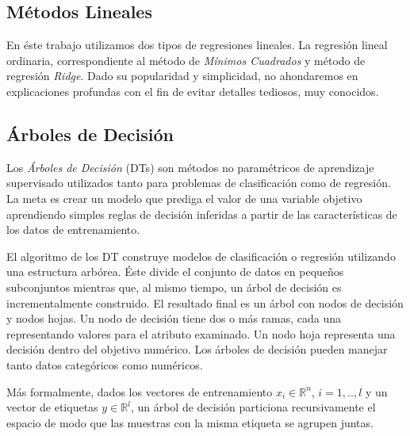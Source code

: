 \subsection{Métodos Lineales}

  \par En éste trabajo utilizamos dos tipos de regresiones lineales. La regresión
  lineal ordinaria, correspondiente al método de \textit{Mínimos Cuadrados}\cite{least_square}
  y método de regresión \textit{Ridge}\cite{ridge}.
  Dado su popularidad y simplicidad, no ahondaremos en explicaciones profundas
  con el fin de evitar detalles tediosos, muy conocidos.


\subsection{Árboles de Decisión}
  \par Los \textit{Árboles de Decisión} (DTs)\cite{decision_tree_regression}
    son métodos no paramétricos de aprendizaje supervisado
    utilizados tanto para problemas de clasificación como de regresión.
    La meta es crear un modelo que prediga el valor de una variable objetivo aprendiendo
    simples reglas de decisión inferidas a partir de las características de los datos
    de entrenamiento.


  \par El algoritmo de los DT construye modelos de clasificación o regresión
    utilizando una estructura arbórea. Éste divide el conjunto de datos en pequeños
    subconjuntos mientras que, al mismo tiempo, un árbol de decisión es incrementalmente
    construido. El resultado final es un árbol con nodos de decisión y nodos hojas.
    Un nodo de decisión tiene dos o más ramas, cada una representando valores para
    el atributo examinado. Un nodo hoja representa una decisión dentro del
    objetivo numérico. Los árboles de decisión pueden manejar tanto datos
    categóricos como numéricos.


  \par Más formalmente, dados los vectores de entrenamiento $x_{i} \in \mathbb{R}^{n}$, $i = 1,..,l$
    y un vector de etiquetas $y \in \mathbb{R}^{l}$, un árbol de decisión particiona
    recursivamente el espacio de modo que las muestras con la misma etiqueta se agrupen juntas.


